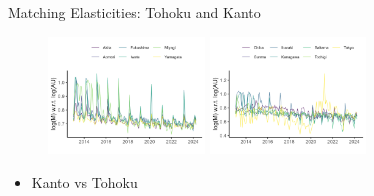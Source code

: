 \documentclass[aspectratio=169]{beamer}
\begin{document}
\begin{frame}{Matching Elasticities: Tohoku and Kanto}
\begin{figure}[!ht]
  \begin{center}
  \includegraphics[width = 0.37\textwidth]
  {figuretable/elasticity_unemployed_month_aggregate_tohoku.png}
  \includegraphics[width = 0.37\textwidth]
  {figuretable/elasticity_unemployed_month_aggregate_kanto.png}
  \end{center}
  \footnotesize
\end{figure} 
\begin{itemize}
    \item Kanto vs Tohoku
\end{itemize}
\end{frame}
\end{document}
